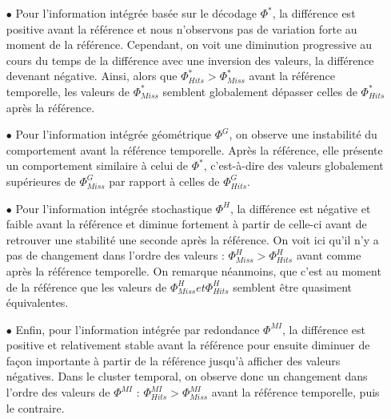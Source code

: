 \begin{itemize}
\item[$\bullet$] Pour l'information intégrée basée sur le décodage $\Phi^{*}$, la différence est positive avant la référence et nous n'observons pas de variation forte au moment de la référence. 
Cependant, on voit une diminution progressive au cours du temps de la différence avec une inversion des valeurs, la différence devenant négative. 
Ainsi, alors que $\Phi^{*}_{Hits} > \Phi^{*}_{Miss}$ avant la référence temporelle, les valeurs de $\Phi^{*}_{Miss}$ semblent globalement dépasser celles de $\Phi^{*}_{Hits}$ après la référence. 
\item[$\bullet$] Pour l'information intégrée géométrique $\Phi^{G}$, on observe une instabilité du comportement avant la référence temporelle. 
Après la référence, elle présente un comportement similaire à celui de $\Phi^{*}$, c'est-à-dire des valeurs globalement supérieures de $\Phi^{G}_{Miss}$ par rapport à celles de $\Phi^{G}_{Hits}$.
\item[$\bullet$] Pour l'information intégrée stochastique $\Phi^{H}$, la différence est négative et faible avant la référence et diminue fortement à partir de celle-ci avant de retrouver une stabilité une seconde après la référence. 
On voit ici qu'il n'y a pas de changement dans l'ordre des valeurs : $\Phi^{H}_{Miss} > \Phi^{H}_{Hits}$ avant comme après la référence temporelle. 
On remarque néanmoins, que c'est au moment de la référence que les valeurs de $\Phi^{H}_{Miss} et \Phi^{H}_{Hits}$ semblent être quasiment équivalentes. 
\item[$\bullet$] Enfin, pour l'information intégrée par redondance $\Phi^{MI}$, la différence est positive et relativement stable avant la référence pour ensuite diminuer de façon importante à partir de la référence jusqu'à afficher des valeurs négatives. 
Dans le cluster temporal, on observe donc un changement dans l'ordre des valeurs de $\Phi^{MI}$ : $\Phi^{MI}_{Hits} > \Phi^{MI}_{Miss}$ avant la référence temporelle, puis le contraire. \\
\end{itemize}

